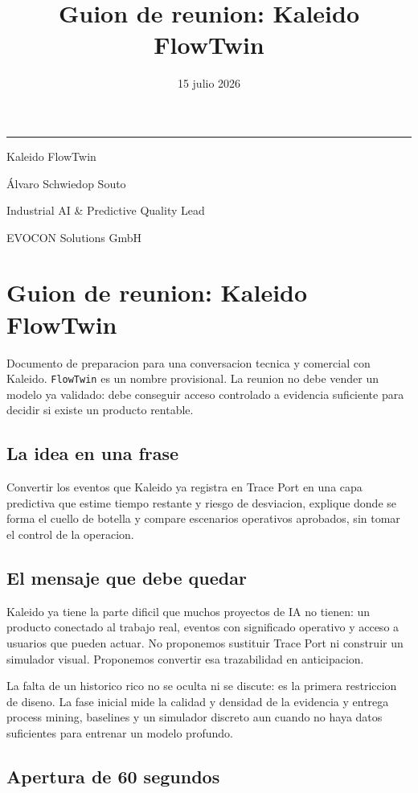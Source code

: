 \documentclass[
  spanish,
  10pt,
  a4paper,
]{article}
\title{Guion de reunion: Kaleido FlowTwin}
\author{}
\date{15 julio 2026}
\makeatletter
\renewcommand{\maketitle}{%
  \hypersetup{pageanchor=false}
  \begin{titlepage}
    \pagecolor{KaleidoNavy}
    \color{white}
    \vspace*{1.4cm}
    {\color{KaleidoCyan}\rule{2.4cm}{2.5pt}\par}
    \vspace{1.1cm}
    {\Huge\bfseries\@title\par}
    \vspace{0.65cm}
    {\Large\color{KaleidoMint}Kaleido FlowTwin\par}
    \vfill
    {\large Álvaro Schwiedop Souto\par}
    \vspace{0.15cm}
    {\normalsize\color{KaleidoMint}Industrial AI \& Predictive Quality Lead\par}
    \vspace{0.15cm}
    {\normalsize\color{KaleidoMint}EVOCON Solutions GmbH\par}
    \vspace{0.25cm}
    {\normalsize\color{KaleidoMint}\@date\par}
  \end{titlepage}
  \hypersetup{pageanchor=true}
  \nopagecolor
  \color{black}
}
\makeatother
\begin{document}
\maketitle

{
\setcounter{tocdepth}{3}
\tableofcontents
}
\section{Guion de reunion: Kaleido
FlowTwin}\label{guion-de-reunion-kaleido-flowtwin}

Documento de preparacion para una conversacion tecnica y comercial con
Kaleido. \texttt{FlowTwin} es un nombre provisional. La reunion no debe
vender un modelo ya validado: debe conseguir acceso controlado a
evidencia suficiente para decidir si existe un producto rentable.

\subsection{La idea en una frase}\label{la-idea-en-una-frase}

Convertir los eventos que Kaleido ya registra en Trace Port en una capa
predictiva que estime tiempo restante y riesgo de desviacion, explique
donde se forma el cuello de botella y compare escenarios operativos
aprobados, sin tomar el control de la operacion.

\subsection{El mensaje que debe
quedar}\label{el-mensaje-que-debe-quedar}

Kaleido ya tiene la parte dificil que muchos proyectos de IA no tienen:
un producto conectado al trabajo real, eventos con significado operativo
y acceso a usuarios que pueden actuar. No proponemos sustituir Trace
Port ni construir un simulador visual. Proponemos convertir esa
trazabilidad en anticipacion.

La falta de un historico rico no se oculta ni se discute: es la primera
restriccion de diseno. La fase inicial mide la calidad y densidad de la
evidencia y entrega process mining, baselines y un simulador discreto
aun cuando no haya datos suficientes para entrenar un modelo profundo.

\subsection{Apertura de 60 segundos}\label{apertura-de-60-segundos}
\end{document}

